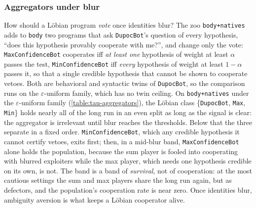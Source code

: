 \subsubsection{Aggregators under blur}
\label{apx-subsubsection:Experiments-Transparency-Aggregators}
How should a Löbian program \emph{vote} once identities blur? The zoo \texttt{body+natives} adds to \texttt{body} two programs that ask \texttt{DupocBot}'s question of every hypothesis, \enquote{does this hypothesis provably cooperate with me?}, and change only the vote: \texttt{MaxConfidenceBot} cooperates iff \emph{at least one} hypothesis of weight at least $\alpha$ passes the test, \texttt{MinConfidenceBot} iff \emph{every} hypothesis of weight at least $1-\alpha$ passes it, so that a single credible hypothesis that cannot be shown to cooperate vetoes. Both are behavioral and syntactic twins of \texttt{DupocBot}, so the comparison runs on the $\varepsilon$-uniform family, which has no twin ceiling. On \texttt{body+natives} under the $\varepsilon$-uniform family (\cref{table:tau-aggregators}), the Löbian class \{\texttt{DupocBot}, \texttt{Max}, \texttt{Min}\} holds nearly all of the long run in an even split as long as the signal is clear: the aggregator is irrelevant until blur reaches the thresholds. Below that the three separate in a fixed order. \texttt{MinConfidenceBot}, which any credible hypothesis it cannot certify vetoes, exits first; then, in a mid-blur band, \texttt{MaxConfidenceBot} alone holds the population, because the sum player is fooled into cooperating with blurred exploiters while the max player, which needs one hypothesis credible on its own, is not. The band is a band of \emph{survival}, not of cooperation: at the most cautious settings the sum and max players share the long run again, but as defectors, and the population's cooperation rate is near zero. Once identities blur, ambiguity aversion is what keeps a Löbian cooperator alive.




